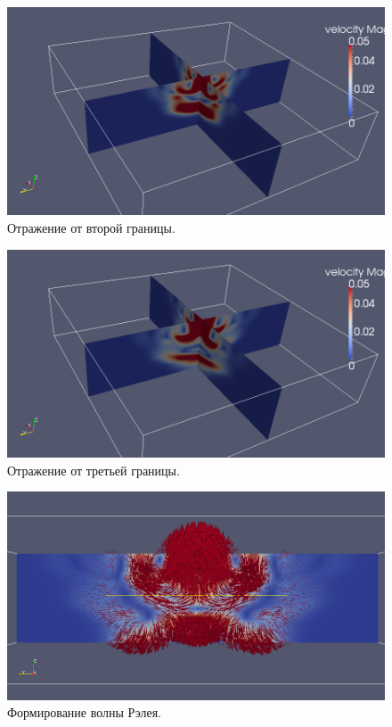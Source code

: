 \begin{figure}[htp]
\centering
\includegraphics[width=\textwidth]{png/v-0007.png}
\caption{Отражение от второй границы.}
\label{pic:multilayer_b2}
\end{figure}
\begin{figure}[htp]
\centering
\includegraphics[width=\textwidth]{png/v-0009.png}
\caption{Отражение от третьей границы.}
\label{pic:multilayer_b3}
\end{figure}
\begin{figure}[htp]
\centering
\includegraphics[width=\textwidth]{png/v-0013.png}
\caption{Формирование волны Рэлея.}
\label{pic:multilayer_b3}
\end{figure}

